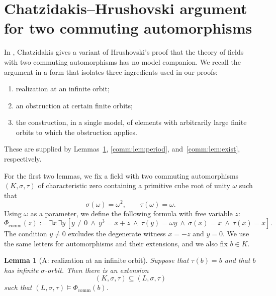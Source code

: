 \documentclass[10pt,a4paper]{amsart}
\newtheorem{lemma}[theorem]{Lemma}
\theoremstyle{definition}
\begin{document}
\section{Chatzidakis--Hrushovski argument for two commuting automorphisms}\label{sec:chatzidakis-argument}

In \cite[Section~1.11]{Survey}, Chatzidakis gives a variant of
Hrushovski's proof that the theory of fields with two commuting
automorphisms has no model companion. We recall the argument in a
form that isolates three ingredients used in our proofs:
\begin{enumerate}
  \item[(A)] realization at an infinite orbit;
  \item[(B)]  an obstruction at certain finite
orbits;
  \item[(C)] the construction, in a single model, of elements with
arbitrarily large finite orbits to which the obstruction applies.
\end{enumerate}
These are supplied by Lemmas~\ref{comm:lem:infinite},
\ref{comm:lem:period}, and~\ref{comm:lem:exist}, respectively.


For the first two lemmas, we fix a field with two commuting
automorphisms $(K,\sigma,\tau)$ of characteristic zero containing
a primitive cube root of unity $\omega$ such that
\[
  \sigma(\omega)=\omega^2,\qquad \tau(\omega)=\omega.
\]
Using $\omega$ as a parameter, we define the following formula
with free variable $z$:
\[
  \Phi_{\mathrm{comm}}(z):=
  \exists x\,\exists y\,
  \left[
    y\ne0
    \ \wedge\ y^3=x+z
    \ \wedge\ \tau(y)=\omega y
    \ \wedge\ \sigma(x)=x
    \ \wedge\ \tau(x)=x
  \right].
\]
The condition $y\ne0$ excludes the degenerate witness
$x=-z$ and $y=0$.
We use the same letters for automorphisms and their extensions, and we also fix $b\in K$.

\begin{lemma}[A: realization at an infinite orbit]
\label{comm:lem:infinite}
Suppose that $\tau(b)=b$ and that $b$ has infinite
$\sigma$-orbit. Then there is an extension
\[
  (K,\sigma,\tau)\subseteq(L,\sigma,\tau)
\]
such that $(L,\sigma,\tau)\models\Phi_{\mathrm{comm}}(b)$.
\end{lemma}
\end{document}
